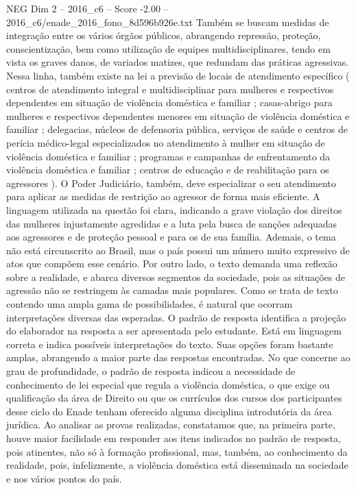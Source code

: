 \begin{textsample}{NEG Dim 2 – 2016\_c6 – Score -2.00 – 2016\_c6/enade\_2016\_fono\_8d596b926e.txt}
Também se buscam medidas de integração entre os vários órgãos públicos, abrangendo repressão, proteção, conscientização, bem como utilização de equipes multidisciplinares, tendo em vista os graves danos, de variados matizes, que redundam das práticas agressivas.
Nessa linha, também existe na lei a previsão de locais de atendimento específico ( centros de atendimento integral e multidisciplinar para mulheres e respectivos dependentes em situação de violência doméstica e familiar ; casas-abrigo para mulheres e respectivos dependentes menores em situação de violência doméstica e familiar ; delegacias, núcleos de defensoria pública, serviços de saúde e centros de perícia médico-legal especializados no atendimento à mulher em situação de violência doméstica e familiar ; programas e campanhas de enfrentamento da violência doméstica e familiar ; centros de educação e de reabilitação para os agressores ).
O Poder Judiciário, também, deve especializar o seu atendimento para aplicar as medidas de restrição ao agressor de forma mais eficiente.
A linguagem utilizada na questão foi clara, indicando a grave violação dos direitos das mulheres injustamente agredidas e a luta pela busca de sanções adequadas aos agressores e de proteção pessoal e para os de sua família.
Ademais, o tema não está circunscrito ao Brasil, mas o país possui um número muito expressivo de atos que compõem esse cenário.
Por outro lado, o texto demanda uma reflexão sobre a realidade, e abarca diversos segmentos da sociedade, pois as situações de agressão não se restringem às camadas mais populares.
Como se trata de texto contendo uma ampla gama de possibilidades, é natural que ocorram interpretações diversas das esperadas.
O padrão de resposta identifica a projeção do elaborador na resposta a ser apresentada pelo estudante.
Está em linguagem correta e indica possíveis interpretações do texto.
Suas opções foram bastante amplas, abrangendo a maior parte das respostas encontradas.
No que concerne ao grau de profundidade, o padrão de resposta indicou a necessidade de conhecimento de lei especial que regula a violência doméstica, o que exige ou qualificação da área de Direito ou que os currículos dos cursos dos participantes desse ciclo do Enade tenham oferecido alguma disciplina introdutória da área jurídica.
Ao analisar as provas realizadas, constatamos que, na primeira parte, houve maior facilidade em responder aos itens indicados no padrão de resposta, pois atinentes, não só à formação profissional, mas, também, ao conhecimento da realidade, pois, infelizmente, a violência doméstica está disseminada na sociedade e nos vários pontos do país.

\end{textsample}
